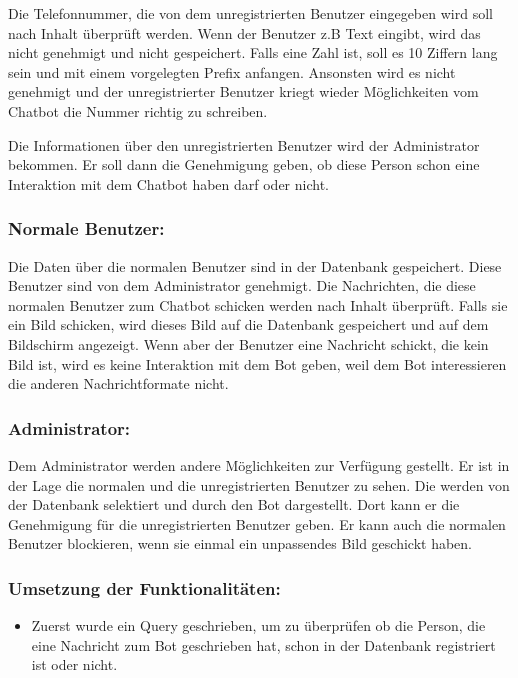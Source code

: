 Die Telefonnummer, die von dem unregistrierten Benutzer eingegeben wird soll nach Inhalt überprüft werden. Wenn der Benutzer z.B Text eingibt, wird das nicht genehmigt und nicht gespeichert. Falls eine Zahl ist, soll es 10 Ziffern lang sein und mit einem vorgelegten Prefix anfangen. Ansonsten wird es nicht genehmigt und der unregistrierter Benutzer kriegt wieder Möglichkeiten vom Chatbot die Nummer richtig zu schreiben. 

Die Informationen über den unregistrierten Benutzer wird der Administrator bekommen. Er soll dann die Genehmigung geben, ob diese Person schon eine Interaktion mit dem Chatbot haben darf oder nicht. 
\subsubsection{Normale Benutzer:}
Die Daten über die normalen Benutzer sind in der Datenbank gespeichert. Diese Benutzer sind von dem Administrator genehmigt. Die Nachrichten, die diese normalen Benutzer zum Chatbot schicken werden nach Inhalt überprüft. Falls sie ein Bild schicken, wird dieses Bild auf die Datenbank gespeichert und auf dem Bildschirm angezeigt. 
Wenn aber der Benutzer eine Nachricht schickt, die kein Bild ist, wird es keine Interaktion mit dem Bot geben, weil dem Bot interessieren die anderen Nachrichtformate nicht.

\subsubsection{Administrator:}
Dem Administrator werden andere Möglichkeiten zur Verfügung gestellt. Er ist in der Lage die normalen und die unregistrierten Benutzer zu sehen. Die werden von der Datenbank selektiert und durch den Bot dargestellt. Dort kann er die Genehmigung für die unregistrierten Benutzer geben. Er kann auch die normalen Benutzer blockieren, wenn sie einmal ein unpassendes Bild geschickt haben. 
\\
\subsubsection{Umsetzung der Funktionalitäten:}
\begin{itemize}
	\item Zuerst wurde ein Query geschrieben, um zu überprüfen ob die Person, die eine Nachricht zum Bot geschrieben hat, schon in der Datenbank registriert ist oder nicht. \\
\end{itemize} 



